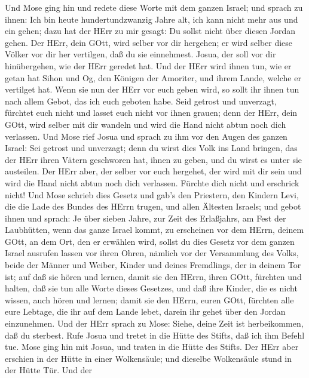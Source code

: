  Und Mose ging hin und redete diese Worte mit dem ganzen
Israel;  und sprach zu ihnen: Ich bin heute
hundertundzwanzig Jahre alt, ich kann nicht mehr aus und ein gehen; dazu
hat der HErr zu mir gesagt: Du sollst nicht über diesen Jordan gehen.
 Der HErr, dein GOtt, wird selber vor dir hergehen; er wird
selber diese Völker vor dir her vertilgen, daß du sie einnehmest. Josua,
der soll vor dir hinübergehen, wie der HErr geredet hat. 
Und der HErr wird ihnen tun, wie er getan hat Sihon und Og, den Königen
der Amoriter, und ihrem Lande, welche er vertilget hat. 
Wenn sie nun der HErr vor euch geben wird, so sollt ihr ihnen tun nach
allem Gebot, das ich euch geboten habe.  Seid getrost und
unverzagt, fürchtet euch nicht und lasset euch nicht vor ihnen grauen;
denn der HErr, dein GOtt, wird selber mit dir wandeln und wird die Hand
nicht abtun noch dich verlassen.  Und Mose rief Josua und
sprach zu ihm vor den Augen des ganzen Israel: Sei getrost und
unverzagt; denn du wirst dies Volk ins Land bringen, das der HErr ihren
Vätern geschworen hat, ihnen zu geben, und du wirst es unter sie
austeilen.  Der HErr aber, der selber vor euch hergehet, der
wird mit dir sein und wird die Hand nicht abtun noch dich verlassen.
Fürchte dich nicht und erschrick nicht!  Und Mose schrieb
dies Gesetz und gab's den Priestern, den Kindern Levi, die die Lade des
Bundes des HErrn trugen, und allen Ältesten Israels;  und
gebot ihnen und sprach: Je über sieben Jahre, zur Zeit des Erlaßjahrs,
am Fest der Laubhütten,  wenn das ganze Israel kommt, zu
erscheinen vor dem HErrn, deinem GOtt, an dem Ort, den er erwählen wird,
sollst du dies Gesetz vor dem ganzen Israel ausrufen lassen vor ihren
Ohren,  nämlich vor der Versammlung des Volks, beide der
Männer und Weiber, Kinder und deines Fremdlings, der in deinem Tor ist;
auf daß sie hören und lernen, damit sie den HErrn, ihren GOtt, fürchten
und halten, daß sie tun alle Worte dieses Gesetzes,  und
daß ihre Kinder, die es nicht wissen, auch hören und lernen; damit sie
den HErrn, euren GOtt, fürchten alle eure Lebtage, die ihr auf dem Lande
lebet, darein ihr gehet über den Jordan einzunehmen.  Und
der HErr sprach zu Mose: Siehe, deine Zeit ist herbeikommen, daß du
sterbest. Rufe Josua und tretet in die Hütte des Stifts, daß ich ihm
Befehl tue. Mose ging hin mit Josua, und traten in die Hütte des Stifts.
 Der HErr aber erschien in der Hütte in einer Wolkensäule;
und dieselbe Wolkensäule stund in der Hütte Tür.  Und der

